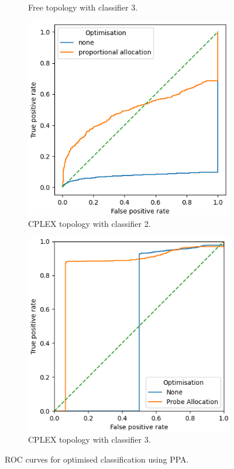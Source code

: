 \begin{figure}[H]
\begin{subfigure}[H]{0.475\textwidth}
        \caption{Free topology with classifier 3.}
    \end{subfigure}
    \begin{subfigure}[H]{0.475\textwidth}
        \includegraphics[width=\textwidth]{figs/results/norway_ac2_opt.png}
        \caption{CPLEX topology with classifier 2.}
    \end{subfigure}
    \begin{subfigure}[H]{0.475\textwidth}
        \includegraphics[width=\textwidth]{figs/results/norway_ac3_opt.png}
        \caption{CPLEX topology with classifier 3.}
    \end{subfigure}
    \caption{ROC curves for optimised classification using PPA.}
    \label{fig:RprobeoptROCcurves}
\end{figure}

